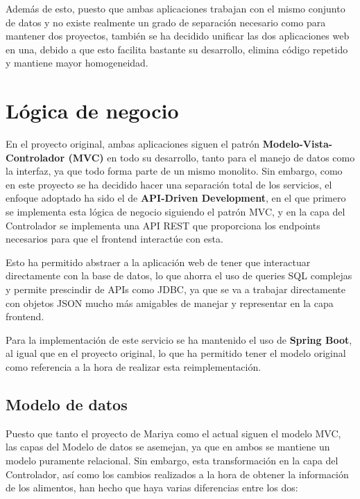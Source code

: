 Además de esto, puesto que ambas aplicaciones trabajan con el mismo conjunto de datos y no existe realmente un grado de separación necesario como para mantener dos proyectos, también se ha decidido unificar las dos aplicaciones web en una, debido a que esto facilita bastante su desarrollo, elimina código repetido y mantiene mayor homogeneidad.

\section{Lógica de negocio}

En el proyecto original, ambas aplicaciones siguen el patrón \textbf{Modelo-Vista-Controlador (MVC)} en todo su desarrollo, tanto para el manejo de datos como la interfaz, ya que todo forma parte de un mismo monolito. Sin embargo, como en este proyecto se ha decidido hacer una separación total de los servicios, el enfoque adoptado ha sido el de \textbf{API-Driven Development}, en el que primero se implementa esta lógica de negocio siguiendo el patrón MVC, y en la capa del Controlador se implementa una API REST que proporciona los endpoints necesarios para que el frontend interactúe con esta. 

Esto ha permitido abstraer a la aplicación web de tener que interactuar directamente con la base de datos, lo que ahorra el uso de queries SQL complejas y permite prescindir de APIs como JDBC, ya que se va a trabajar directamente con objetos JSON mucho más amigables de manejar y representar en la capa frontend.

Para la implementación de este servicio se ha mantenido el uso de \textbf{Spring Boot}, al igual que en el proyecto original, lo que ha permitido tener el modelo original como referencia a la hora de realizar esta reimplementación.

\subsection{Modelo de datos}

Puesto que tanto el proyecto de Mariya como el actual siguen el modelo MVC, las capas del Modelo de datos se asemejan, ya que en ambos se mantiene un modelo puramente relacional. Sin embargo, esta transformación en la capa del Controlador, así como los cambios realizados a la hora de obtener la información de los alimentos, han hecho que haya varias diferencias entre los dos:


